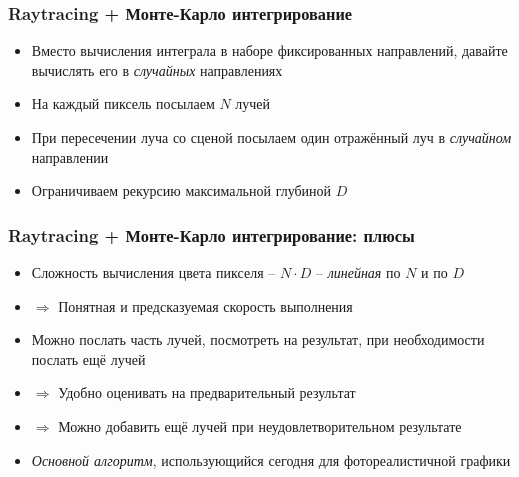 \documentclass[handout,10pt]{beamer}
\begin{document}
\begin{frame}[fragile]
\frametitle{Raytracing + Монте-Карло интегрирование}
\begin{itemize}
\item Вместо вычисления интеграла в наборе фиксированных направлений, давайте вычислять его в \textit{случайных} направлениях
\pause
\item На каждый пиксель посылаем \begin{math}N\end{math} лучей
\pause
\item При пересечении луча со сценой посылаем один отражённый луч в \textit{случайном} направлении
\pause
\item Ограничиваем рекурсию максимальной глубиной \begin{math}D\end{math}
\end{itemize}
\end{frame}

\begin{frame}[fragile]
\frametitle{Raytracing + Монте-Карло интегрирование: плюсы}
\begin{itemize}
\item Сложность вычисления цвета пикселя -- \begin{math}N\cdot D\end{math} -- \textit{линейная} по \begin{math}N\end{math} и по \begin{math}D\end{math}
\pause
\item \begin{math}\Longrightarrow\end{math} Понятная и предсказуемая скорость выполнения
\pause
\item Можно послать часть лучей, посмотреть на результат, при необходимости послать ещё лучей
\pause
\item \begin{math}\Longrightarrow\end{math} Удобно оценивать на предварительный результат
\pause
\item \begin{math}\Longrightarrow\end{math} Можно добавить ещё лучей при неудовлетворительном результате
\pause
\item \textit{Основной алгоритм}, использующийся сегодня для фотореалистичной графики
\end{itemize}
\end{frame}
\end{document}
